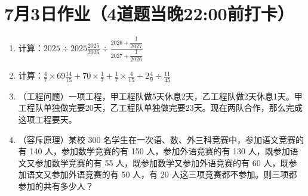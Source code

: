 \documentclass[UTF8,12pt,a4paper]{ctexart}
\newcommand{\BottomWriteSpace}{2.5cm}
\newenvironment{OnePageFourFill}{
  \small
  \vspace*{0pt}
  \begin{enumerate}[leftmargin=*, itemsep=0pt, topsep=0pt, parsep=0pt, partopsep=0pt]
  \setlength{\parskip}{0pt}
}{
  \end{enumerate}
  \vspace*{\BottomWriteSpace}
  \normalsize
  \newpage
}
\newcommand{\Q}[1]{\item #1\par\vfill}
\newcommand{\Qlast}[1]{\item #1\par}
\begin{document}
\section*{7月3日作业（4道题当晚22:00前打卡）}
\begin{OnePageFourFill}

\Q{计算：$\displaystyle 2025 \div 2025\frac{2025}{2026} \div \frac{2026 + \dfrac{1}{2027}}{2027 + \dfrac{1}{2026}}$}

\Q{计算：$\displaystyle \frac{4}{7} \times 69\frac{14}{15} + 70 \times \frac{1}{7} + \frac{1}{7} \times \frac{4}{15} + 2\frac{4}{9} \div \frac{11}{45}$}

\Q{（工程问题）一项工程，甲工程队做5天休息2天，乙工程队做2天休息1天。甲工程队单独做完要20天，乙工程队单独做完要23天。现在两队合作，那么完成这项工程要\underline{\hspace{3em}}天。}

\Qlast{（容斥原理）某校 300 名学生在一次语、数、外三科竞赛中，参加语文竞赛的有 140 人，参加数学竞赛的有 150 人，参加外语竞赛的有 130 人，既参加语文又参加数学竞赛的有 55 人，既参加数学又参加外语竞赛的有 60 人，既参加语文又参加外语竞赛的有 50 人，有 20 人这三项竞赛都不参加。则三项都参加的共有多少人？}

\end{OnePageFourFill}
\end{document}
